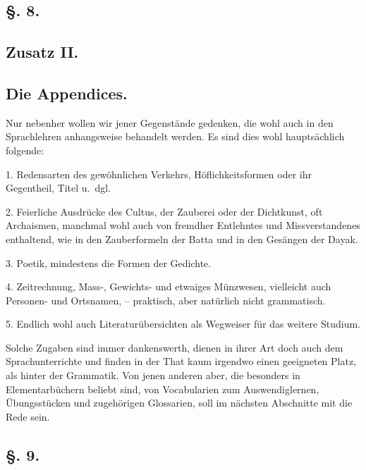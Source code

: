 \subsection*{§. 8.}\label{II.VI.8}
\subsection*{Zusatz II.}
\subsection*{Die Appendices.}

Nur nebenher wollen wir jener Gegenstände gedenken, die wohl auch in den Sprachlehren anhangsweise behandelt werden. Es sind dies wohl hauptsächlich folgende:

\label{sp.107}

1. Redensarten des gewöhnlichen Verkehrs, Höflichkeitsformen oder ihr Gegentheil, Titel u.~dgl.

2. Feierliche Ausdrücke des Cultus, der Zauberei oder der Dichtkunst, oft Archaismen, manchmal wohl auch von fremdher Entlehntes und Missverstandenes enthaltend, wie in den Zauberformeln der Batta und in den Gesängen der Dayak.

3. Poetik, mindestens die Formen der Gedichte.

4. Zeitrechnung, Mass-, Gewichts- und etwaiges Münzwesen, vielleicht auch Personen- und Ortsnamen, – praktisch, aber natürlich nicht grammatisch.

\label{fp.112}

5. Endlich wohl auch Literaturübersichten als Wegweiser für das weitere Studium.

Solche Zugaben sind immer dankenswerth, dienen in ihrer Art doch auch dem Sprachunterrichte und finden in der That kaum irgendwo einen geeigneten Platz, als hinter der Grammatik. Von jenen anderen aber, die besonders in Elementarbüchern beliebt sind, von Vocabularien zum Auswendiglernen, Übungsstücken und zugehörigen Glossarien, soll im nächsten Abschnitte mit die Rede sein.

\subsection*{§. 9.}\label{II.VI.9}

